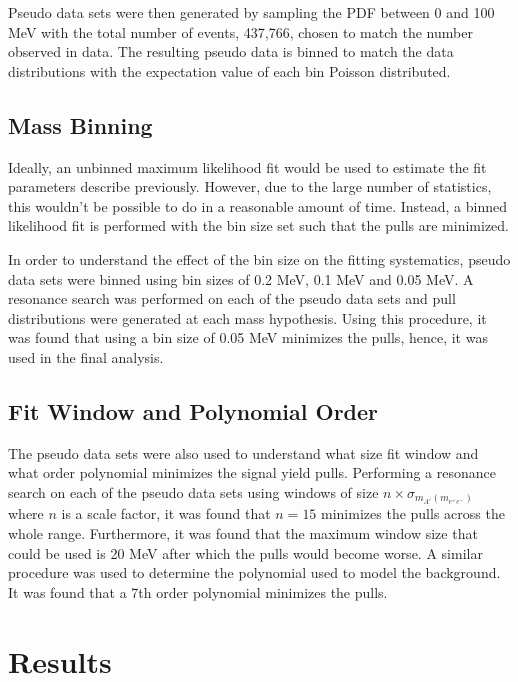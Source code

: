 Pseudo data sets were then generated
by sampling the PDF between 0 and 100 MeV with the total number of
events, 437,766, chosen to match the number observed in data.  The resulting
pseudo data is binned to match the data distributions with the expectation
value of each bin Poisson distributed.


\subsection{Mass Binning}

Ideally, an unbinned maximum likelihood fit would be used to estimate the fit 
parameters describe previously.  However, due to the large number of statistics, 
this wouldn't be possible to do in a reasonable amount of time.  Instead, 
a binned likelihood fit is performed with the bin size set such that the 
pulls are minimized.

In order to understand the effect of the bin size on the fitting systematics, 
pseudo data sets were binned using bin sizes of 0.2 MeV, 0.1 MeV and 0.05 MeV.
A resonance search was performed on each of the pseudo data sets and pull 
distributions were generated at 
each mass hypothesis.
Using this procedure, it was found that using
a bin size of 0.05 MeV minimizes the pulls, hence, it was used in the final
analysis.

\subsection{Fit Window and Polynomial Order} \label{subsec:poly}

The pseudo data sets were also used to understand what size fit window and what 
order polynomial minimizes the signal yield pulls. Performing a resonance search on 
each of the pseudo data sets using windows of size $n \times \sigma_{m_{A'}(m_{e^+e^-})}$
where $n$ is a scale factor, it was found that $n = 15$ minimizes the pulls 
across the whole range. Furthermore, it was found that the maximum window
size that could be used is 20 MeV after which the pulls would become worse. 
A similar procedure was used to determine the polynomial used to model the background.
It was found that a 7th order polynomial minimizes the pulls. 

\section{Results}

